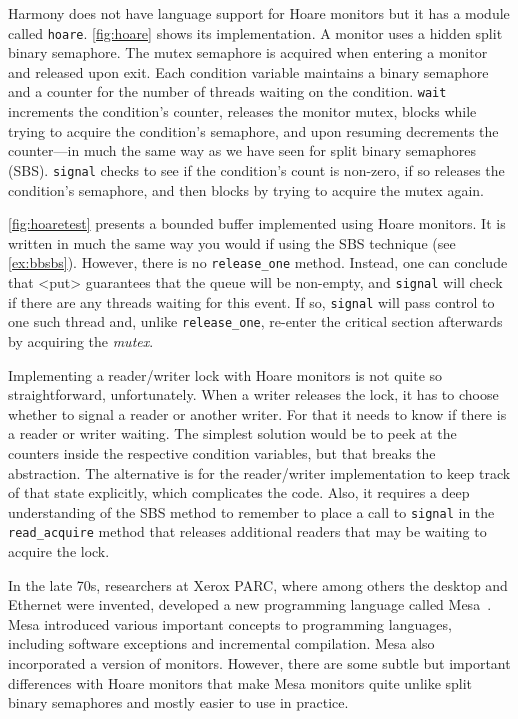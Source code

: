 \documentclass{report}
\begin{document}
{Harmony does not have language support for Hoare monitors but it
has a module called \texttt{hoare}.
\autoref{fig:hoare} shows its implementation.
A monitor uses a hidden split binary semaphore.
The mutex semaphore is acquired when entering a monitor and released
upon exit.
Each condition variable maintains a binary semaphore and a counter for
the number of threads waiting on the condition.
\texttt{wait} increments the condition's counter, releases the monitor mutex,
blocks while trying to acquire the condition's semaphore, and upon resuming
decrements the counter---in much the same way as we have seen for split binary
semaphores (SBS).
\texttt{signal} checks to see if the condition's count is non-zero, if so
releases the condition's semaphore,
and then blocks by trying to acquire the mutex again.

\autoref{fig:hoaretest} presents a bounded buffer implemented using
Hoare monitors.
It is written in much the same way you would if using
the SBS technique (see \autoref{ex:bbsbs}).
However, there is no \texttt{release\_one} method.
Instead, one can conclude
that <{put}> guarantees that the queue will be non-empty, and
\texttt{signal} will check if there are any threads waiting for
this event.  If so, \texttt{signal} will pass control to one such thread
and, unlike \texttt{release\_one}, re-enter the critical
section afterwards by acquiring the \textit{mutex}.

Implementing a reader/writer lock with Hoare monitors is not quite so
straightforward, unfortunately.  When a writer releases the lock, it
has to choose whether to signal a reader or another writer.  For that
it needs to know if there is a reader or writer waiting.  The simplest
solution would be to peek at the counters inside the respective condition
variables, but that breaks the abstraction.  The alternative is for the
reader/writer implementation to keep track of that state explicitly,
which complicates the code.  Also, it requires a deep understanding of
the SBS method to remember to place a call to \texttt{signal} in the
\texttt{read\_acquire} method that releases additional readers that
may be waiting to acquire the lock.

In the late 70s, researchers at Xerox PARC,
where among others the desktop and Ethernet
were invented, developed a new programming language called
Mesa~\cite{LR80}.
%
Mesa introduced various important concepts to programming languages,
including software exceptions and incremental compilation.  Mesa also
incorporated a version of monitors.
However, there are some subtle but important differences with Hoare
monitors that make Mesa monitors quite unlike split binary semaphores
and mostly easier to use in practice.

}
\end{document}
